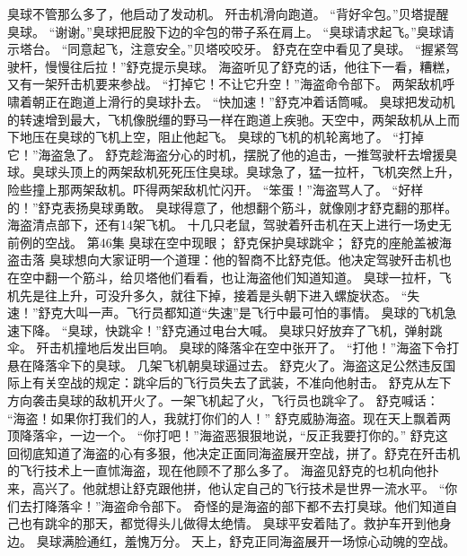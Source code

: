 \documentclass[a4paper,12pt,UTF8,twoside]{ctexbook}
\begin{document}
        臭球不管那么多了，他启动了发动机。 
        歼击机滑向跑道。 
        “背好伞包。”贝塔提醒臭球。 
        “谢谢。”臭球把屁股下边的伞包的带子系在肩上。 
        “臭球请求起飞。”臭球请示塔台。 
        “同意起飞，注意安全。”贝塔咬咬牙。 
        舒克在空中看见了臭球。 
        “握紧驾驶杆，慢慢往后拉！”舒克提示臭球。 
        海盗听见了舒克的话，他往下一看，糟糕，又有一架歼击机要来参战。 
        “打掉它！不让它升空！”海盗命令部下。 
        两架敌机呼啸着朝正在跑道上滑行的臭球扑去。 
        “快加速！”舒克冲着话筒喊。 
        臭球把发动机的转速增到最大，飞机像脱缰的野马一样在跑道上疾驰。天空中，两架敌机从上而下地压在臭球的飞机上空，阻止他起飞。 
        臭球的飞机的机轮离地了。 
        “打掉它！”海盗急了。 
        舒克趁海盗分心的时机，摆脱了他的追击，一推驾驶杆去增援臭球。臭球头顶上的两架敌机死死压住臭球。臭球急了，猛一拉杆，飞机突然上升，险些撞上那两架敌机。吓得两架敌机忙闪开。 
        “笨蛋！”海盗骂人了。 
        “好样的！”舒克表扬臭球勇敢。 
        臭球得意了，他想翻个筋斗，就像刚才舒克翻的那样。 
        海盗清点部下，还有14架飞机。 
        十几只老鼠，驾驶着歼击机在天上进行一场史无前例的空战。   第46集 
        臭球在空中现眼； 
        舒克保护臭球跳伞； 
        舒克的座舱盖被海盗击落   
        臭球想向大家证明一个道理：他的智商不比舒克低。他决定驾驶歼击机也在空中翻一个筋斗，给贝塔他们看看，也让海盗他们知道知道。 
        臭球一拉杆，飞机先是往上升，可没升多久，就往下掉，接着是头朝下进入螺旋状态。 
        “失速！”舒克大叫一声。飞行员都知道“失速”是飞行中最可怕的事情。 
        臭球的飞机急速下降。 
        “臭球，快跳伞！”舒克通过电台大喊。 
        臭球只好放弃了飞机，弹射跳伞。 
        歼击机撞地后发出巨响。 
        臭球的降落伞在空中张开了。 
        “打他！”海盗下令打悬在降落伞下的臭球。 
        几架飞机朝臭球逼过去。 
        舒克火了。海盗这足公然违反国际上有关空战的规定：跳伞后的飞行员失去了武装，不准向他射击。 
        舒克从左下方向袭击臭球的敌机开火了。一架飞机起了火，飞行员也跳伞了。 
        舒克喊话： 
        “海盗！如果你打我们的人，我就打你们的人！” 
        舒克威胁海盗。现在天上飘着两顶降落伞，一边一个。 
        “你打吧！”海盗恶狠狠地说，“反正我要打你的。” 
        舒克这回彻底知道了海盗的心有多狠，他决定正面同海盗展开空战，拼了。舒克在歼击机的飞行技术上一直怵海盗，现在他顾不了那么多了。 
        海盗见舒克的乜机向他扑来，高兴了。他就想让舒克跟他拼，他认定自己的飞行技术是世界一流水平。 
        “你们去打降落伞！”海盗命令部下。 
        奇怪的是海盗的部下都不去打臭球。他们知道自己也有跳伞的那天，都觉得头儿做得太绝情。 
        臭球平安着陆了。救护车开到他身边。 
        臭球满脸通红，羞愧万分。 
        天上，舒克正同海盗展开一场惊心动魄的空战。 
\end{document}

